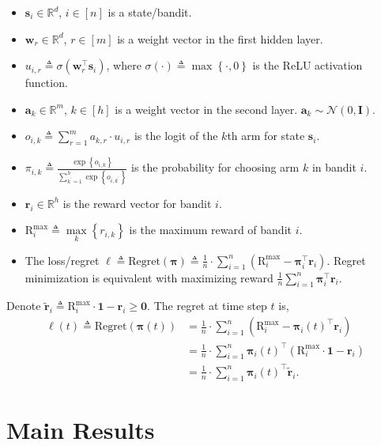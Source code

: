 \documentclass{article}
\def\rva{{\mathbf{a}}}
\def\rvr{{\mathbf{r}}}
\def\rvs{{\mathbf{s}}}
\def\rvw{{\mathbf{w}}}
\def\rvone{{\mathbf{1}}}
\def\rvzero{{\mathbf{0}}}
\def\rvtilder{{\tilde{\mathbf{r}}}}
\def\r{{\text{R}}}
\def\regret{{\text{Regret}}}
\def\rvpi{{\boldsymbol{\pi}}}
\def\rmI{{\mathbf{I}}}
\def\sR{{\mathbb{R}}}
\def\gN{{\mathcal{N}}}
\begin{document}
\begin{itemize}
	\item $\rvs_i \in \sR^d$, $i \in [n]$ is a state/bandit.
	\item $\rvw_r \in \sR^d$, $r \in [m]$ is a weight vector in the first hidden layer.
	\item $u_{i,r} \triangleq \sigma(\rvw_r^\top \rvs_i)$, where $\sigma(\cdot) \triangleq \max\left\{ \cdot, 0 \right\}$ is the ReLU activation function.
	\item $\rva_k \in \sR^m$, $k \in [h]$ is a weight vector in the second layer. $\rva_k \sim \gN(0, \rmI)$.
	\item $o_{i,k} \triangleq \sum\limits_{r=1}^{m}{a_{k,r} \cdot u_{i,r}}$ is the logit of the $k$th arm for state $\rvs_i$.
	\item $\pi_{i,k} \triangleq \frac{\exp\left\{ o_{i,k} \right\}}{\sum\limits_{k^\prime = 1}^{h}{\exp\left\{ o_{i,k^\prime} \right\}}}$ is the  probability for choosing arm $k$ in bandit $i$.
	\item $\rvr_i \in \sR^h$ is the reward vector for bandit $i$.
	\item $\r_i^{\max} \triangleq \max\limits_{k}\left\{ r_{i,k} \right\}$ is the maximum reward of bandit $i$.
	\item The loss/regret $\ell \triangleq \regret(\rvpi) \triangleq \frac{1}{n} \cdot \sum\limits_{i=1}^{n}{ \left( \r_i^{\max} - \rvpi_i^\top \rvr_i \right) }$. Regret minimization is equivalent with maximizing reward $\frac{1}{n} \sum\limits_{i=1}^{n}{\rvpi_i^\top \rvr_i}$.
\end{itemize}

Denote $\rvtilder_{i} \triangleq \r_i^{\max} \cdot \rvone -  \rvr_{i} \ge \rvzero$. The regret at time step $t$ is,
\begin{equation*}
\begin{split}
	\ell(t) \triangleq \regret(\rvpi(t)) &= \frac{1}{n} \cdot \sum\limits_{i=1}^{n}{ \left( \r_i^{\max} - \rvpi_{i}(t)^\top \rvr_i \right) } \\
	&= \frac{1}{n} \cdot \sum\limits_{i=1}^{n}{ \rvpi_{i}(t)^\top \left( \r_i^{\max} \cdot \rvone - \rvr_{i} \right) } \\
	&= \frac{1}{n} \cdot \sum\limits_{i=1}^{n}{ \rvpi_{i}(t)^\top \rvtilder_{i} }.
\end{split}
\end{equation*}

\section{Main Results}
\end{document}
